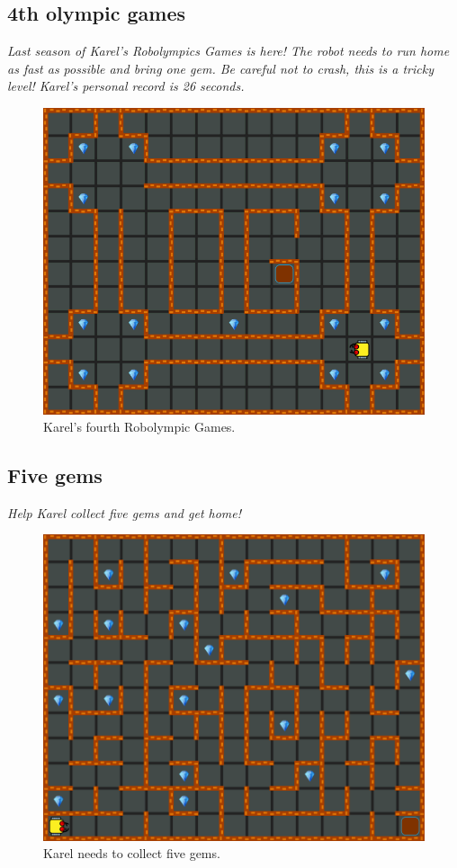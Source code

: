 \subsection{4th olympic games}

{\em Last season of Karel's Robolympics Games is here! The 
robot needs to run home as fast as possible and bring one gem. 
Be careful not to crash, this is a tricky level! Karel's personal record is 26 seconds.}\\[-7mm]

\begin{figure}[!ht]
\begin{center}
\includegraphics[height=0.4\textwidth]{img/a08.png}
\end{center}
\vspace{-4mm}
\caption{Karel's fourth Robolympic Games.}
\label{fig:a08}
\vspace{-4mm}
\end{figure}
\noindent

\subsection{Five gems}

{\em Help Karel collect five gems and get home!}\\[-7mm]

\begin{figure}[!ht]
\begin{center}
\includegraphics[height=0.4\textwidth]{img/a09.png}
\end{center}
\vspace{-4mm}
\caption{Karel needs to collect five gems.}
\label{fig:a09}
\vspace{-10mm}
\end{figure}
\noindent
\newpage

